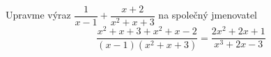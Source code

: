 \begin{mdframed}[style=mdexam]
  \begin{example}\label{MAI:exam116}
    Upravme výraz \(\dfrac{1}{x-1}+\dfrac{x+2}{x^2+x+3}\) na společný jmenovatel
    \begin{equation*}
      \dfrac{x^2+x+3+x^2+x-2}{(x-1)(x^2+x+3)}= \dfrac{2x^2+2x+1}{x^3+2x-3}
    \end{equation*}  
  \end{example}
\end{mdframed}